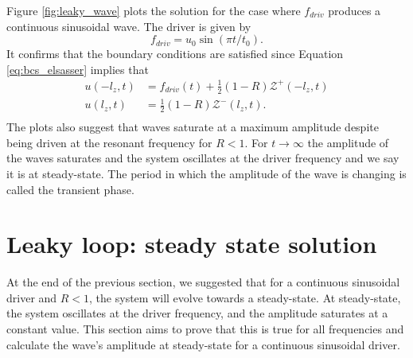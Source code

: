 Figure \ref{fig:leaky_wave} plots the solution for the case where $f_{driv}$ produces a continuous sinusoidal wave. The driver is given by
\begin{equation}
    \label{eq:f_driv_leaky_wave}
    f_{driv} = u_0 \sin(\pi t / t_0).
\end{equation}
It confirms that the boundary conditions are satisfied since Equation \eqref{eq:bcs_elsasser} implies that
\begin{equation}
\begin{aligned}
    u(-l_z,t) &= f_{driv}(t)+\frac{1}{2}(1-R)\mathcal{Z}^+(-l_z,t) \\
    u(l_z,t) &= \frac{1}{2}(1-R)\mathcal{Z}^-(l_z,t). \\
\end{aligned}
\end{equation}
The plots also suggest that waves saturate at a maximum amplitude despite being driven at the resonant frequency for $R<1$. For $t\rightarrow \infty$ the amplitude of the waves saturates and the system oscillates at the driver frequency and we say it is at steady-state. The period in which the amplitude of the wave is changing is called the transient phase.

\section{Leaky loop: steady state solution}
\label{sec:leaky_loop_steady_state_solution}

At the end of the previous section, we suggested that for a continuous sinusoidal driver and $R<1$, the system will evolve towards a steady-state. At steady-state, the system oscillates at the driver frequency, and the amplitude saturates at a constant value. This section aims to prove that this is true for all frequencies and calculate the wave's amplitude at steady-state for a continuous sinusoidal driver.

